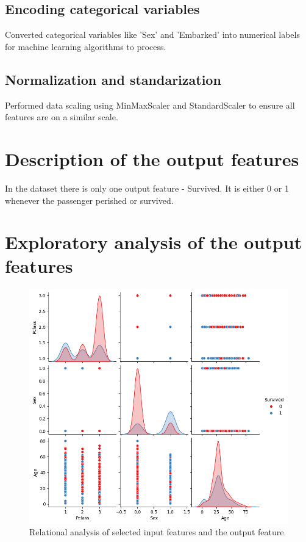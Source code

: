 \documentclass{article}
\begin{document}
\subsection{Encoding categorical variables}

Converted categorical variables like 'Sex' and 'Embarked' into numerical labels for machine learning algorithms to process.

\subsection{Normalization and standarization}

Performed data scaling using MinMaxScaler and StandardScaler to ensure all features are on a similar scale.

\section{Description of the output features}

In the dataset there is only one output feature - Survived. It is either 0 or 1 whenever the passenger perished or survived.

\section{Exploratory analysis of the output features}

\begin{figure}[H]
    \centering
    \includegraphics[width=1\linewidth]{output_features.png}
    \caption{Relational analysis of selected input features and the output feature}
    \label{fig:pairwise-relationships analysis}
\end{figure}
\end{document}
